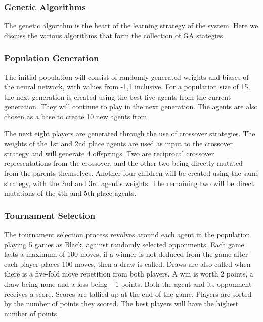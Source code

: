 \documentclass[12pt,a4paper]{article}
\begin{document}
    

    
    

\subsubsection{Genetic Algorithms} 

    The genetic algorithm is the heart of the learning strategy of the system. Here we discuss the various algorithms that form the collection of GA stategies.

\subsubsection{Population Generation}

    The initial population will consist of randomly generated weights and biases of the neural network, with values from -1,1 inclusive. For a population size of 15, the next generation is created using the best five agents from the current generation. They will continue to play in the next generation. The agents are also chosen as a base to create 10 new agents from.

    The next eight players are generated through the use of crossover strategies. The weights of the 1st and 2nd place agents are used as input to the crossover strategy and will generate 4 offsprings. Two are reciprocal crossover representations from the crossover, and the other two being directly mutated from the parents themselves. Another four children will be created using the same strategy, with the 2nd and 3rd agent's weights.
    The remaining two will be direct mutations of the 4th and 5th place agents.

\subsubsection{Tournament Selection}

    The tournament selection process revolves around each agent in the population playing 5 games as Black, against randomly selected opponments. Each game lasts a maximum of 100 moves; if a winner is not deduced from the game after each player places 100 moves, then a draw is called. Draws are also called when there is a five-fold move repetition from both players. A win is worth $2$ points, a draw being none and a loss being $-1$ points. Both the agent and its opponment receives a score. Scores are tallied up at the end of the game. Players are sorted by the number of points they scored. The best players will have the highest number of points.
\end{document}
